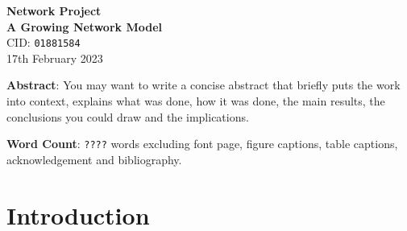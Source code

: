 \documentclass[a4paper,12pt]{article}
\begin{document}

\begin{center}
 {\Large\textbf{Network Project}}  \\[3pt]
 {\Large\textbf{A Growing Network Model}} \\[6pt]
 {\large CID: \texttt{01881584}} \\[3pt]
 17th February 2023 %
\end{center}


\vspace*{2cm}
\noindent
\textbf{Abstract}: You may want to write a concise abstract that briefly puts the
work into context, explains what was done, how it was done, the main results,
the conclusions you could draw and the implications.

\vspace*{0.5cm}
\noindent
\textbf{Word Count}: \texttt{????} words excluding font page, figure captions, table captions, acknowledgement and bibliography.


%
%

%
%







\setcounter{section}{-1}
\section{Introduction}\label{sintro}
\end{document}
